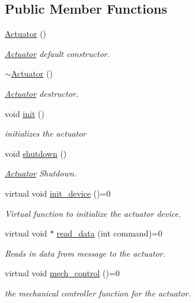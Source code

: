 \subsection*{Public Member Functions}
\begin{DoxyCompactItemize}
\item 
\hyperlink{classActuator_ad08f81ed90eb01f4654acb47eff38be6}{Actuator} ()
\begin{DoxyCompactList}\small\item\em \hyperlink{classActuator}{Actuator} default constructor. \end{DoxyCompactList}\item 
\hyperlink{classActuator_a3c19e3031076395a918ab72e1acc8a3c}{$\sim$\-Actuator} ()
\begin{DoxyCompactList}\small\item\em \hyperlink{classActuator}{Actuator} destructor. \end{DoxyCompactList}\item 
void \hyperlink{classActuator_a0ab156ee6321eb413171e7a04ae4d1ca}{init} ()
\begin{DoxyCompactList}\small\item\em initializes the actuator \end{DoxyCompactList}\item 
void \hyperlink{classActuator_abd625b1dfd7dd296e814751e821eae4b}{shutdown} ()
\begin{DoxyCompactList}\small\item\em \hyperlink{classActuator}{Actuator} Shutdown. \end{DoxyCompactList}\item 
virtual void \hyperlink{classActuator_a13e33ed9c5e19a52bc6d0b7e3c0dd2d7}{init\-\_\-device} ()=0
\begin{DoxyCompactList}\small\item\em Virtual function to initialize the actuator device. \end{DoxyCompactList}\item 
virtual void $\ast$ \hyperlink{classActuator_a65fe83ffd7895f3ab028b87a62b3af1d}{read\-\_\-data} (int command)=0
\begin{DoxyCompactList}\small\item\em Reads in data from message to the actuator. \end{DoxyCompactList}\item 
virtual void \hyperlink{classActuator_a05dd923b5162ebad197fc04d07d9771f}{mech\-\_\-control} ()=0
\begin{DoxyCompactList}\small\item\em the mechanical controller function for the actuator. \end{DoxyCompactList}\item 

\end{DoxyCompactItemize}
